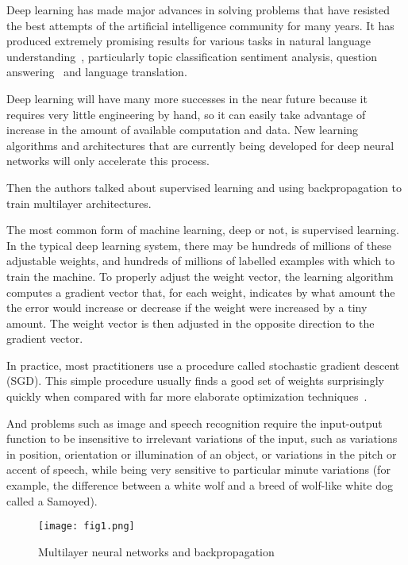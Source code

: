 \documentclass[10pt,twocolumn,letterpaper]{article}
\begin{document}
	Deep learning has made major advances in solving problems that have resisted the best attempts of the artificial intelligence community for many years. It has produced extremely promising results for various tasks in natural language understanding~\cite{NLPS}, particularly topic classification sentiment analysis, question answering~\cite{QA} and language translation.
	\par
	Deep learning will have many more successes in the near future because it requires very little engineering by hand, so it can easily take advantage of increase in the amount of available computation and data. New learning algorithms and architectures that are currently being developed for deep neural networks will only accelerate this process.
	\par
	Then the authors talked about supervised learning and using backpropagation to train multilayer architectures. 
	\par
	The most common form of machine learning, deep or not, is supervised learning. In the typical deep learning system, there may be hundreds of millions of these adjustable weights, and hundreds of millions of labelled examples with which to train the machine. To properly adjust the weight vector, the learning algorithm computes a gradient vector that, for each weight, indicates by what amount the the error would increase or decrease if the weight were increased by a tiny amount. The weight vector is then adjusted in the opposite direction to the gradient vector.
	\par
	In practice, most practitioners use a procedure called stochastic gradient descent (SGD). This simple procedure usually finds a good set of weights surprisingly quickly when compared with far more elaborate optimization techniques~\cite{Bottou2007The}.
	\par
	And problems such as image and speech recognition require the input-output function to be insensitive to irrelevant variations of the input, such as variations in position, orientation or illumination of an object, or variations in the pitch or accent of speech, while being very sensitive to particular minute variations (for example, the difference between a white wolf and a breed of wolf-like white dog called a Samoyed).
	\begin{figure*}[t]
		\centering
		\texttt{[image: fig1.png]}
		\caption{Multilayer neural networks and backpropagation} \label{fig1}
	\end{figure*}
	\par
\end{document}
